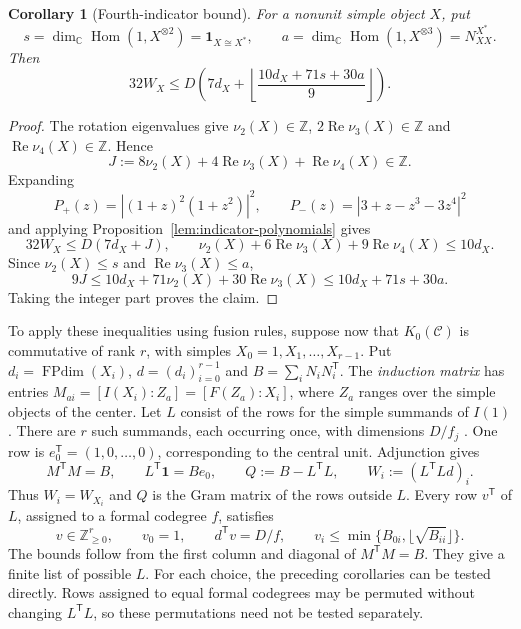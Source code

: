 \documentclass[11pt]{amsart}
\newtheorem{corollary}[theorem]{Corollary}
\theoremstyle{definition}
\DeclareMathOperator{\FPdim}{FPdim}
\newcommand{\C}{\mathbb C}
\newcommand{\Z}{\mathbb Z}
\numberwithin{equation}{section}
\begin{document}
\begin{corollary}[Fourth-indicator bound]\label{prop:fourth-indicator}
For a nonunit simple object $X$, put
\[
 s=\dim_{\C}\operatorname{Hom}(1,X^{\otimes2})=\mathbf1_{X\cong X^*},
 \qquad a=\dim_{\C}\operatorname{Hom}(1,X^{\otimes3})=N_{XX}^{X^*}.
\]
Then
\[
 32W_X\leq D\left(7d_X+
       \left\lfloor\frac{10d_X+71s+30a}{9}\right\rfloor\right).
\]
\end{corollary}
\begin{proof}
The rotation eigenvalues give $\nu_2(X)\in\Z$,
$2\operatorname{Re}\nu_3(X)\in\Z$ and
$\operatorname{Re}\nu_4(X)\in\Z$. Hence
\[
 J:=8\nu_2(X)+4\operatorname{Re}\nu_3(X)
                     +\operatorname{Re}\nu_4(X)\in\Z.
\]
Expanding
\[
 P_+(z)=|(1+z)^2(1+z^2)|^2,\qquad
 P_-(z)=|3+z-z^3-3z^4|^2
\]
and applying Proposition~\ref{lem:indicator-polynomials} gives
\[
 32W_X\leq D(7d_X+J),\qquad
 \nu_2(X)+6\operatorname{Re}\nu_3(X)+9\operatorname{Re}\nu_4(X)
 \leq10d_X.
\]
Since $\nu_2(X)\leq s$ and $\operatorname{Re}\nu_3(X)\leq a$,
\[
 9J\leq10d_X+71\nu_2(X)+30\operatorname{Re}\nu_3(X)
     \leq10d_X+71s+30a.
\]
Taking the integer part proves the claim.
\end{proof}

To apply these inequalities using fusion rules, suppose now that
$K_0(\mathcal C)$ is commutative of rank $r$, with simples
$X_0=1,X_1,\ldots,X_{r-1}$. Put $d_i=\FPdim(X_i)$,
$d=(d_i)_{i=0}^{r-1}$ and $B=\sum_iN_iN_i^{\mathsf T}$.
The \emph{induction matrix} has entries
$M_{ai}=[I(X_i):Z_a]=[F(Z_a):X_i]$, where $Z_a$ ranges over the
simple objects of the center. Let $L$ consist of the rows for the
simple summands of $I(1)$. There are $r$ such summands, each occurring
once, with dimensions $D/f_j$ \cite[Theorem~2.13]{OstrikRank3}.
One row is $e_0^{\mathsf T}=(1,0,\ldots,0)$, corresponding to the
central unit. Adjunction gives
\[
 M^{\mathsf T}M=B,\qquad L^{\mathsf T}\mathbf1=Be_0,\qquad
 Q:=B-L^{\mathsf T}L,\qquad W_i:=(L^{\mathsf T}Ld)_i.
\]
Thus $W_i=W_{X_i}$ and $Q$ is the Gram matrix of the rows outside $L$.
Every row $v^{\mathsf T}$ of $L$, assigned to a formal codegree $f$, satisfies
\[
 v\in\Z_{\geq0}^r,\qquad v_0=1,\qquad d^{\mathsf T}v=D/f,
 \qquad v_i\leq\min\{B_{0i},\lfloor\sqrt{B_{ii}}\rfloor\}.
\]
The bounds follow from the first column and diagonal of
$M^{\mathsf T}M=B$. They give a finite list of possible $L$.
For each choice, the preceding corollaries can be tested directly.
Rows assigned to equal formal codegrees may be permuted without changing
$L^{\mathsf T}L$, so these permutations need not be tested separately.
\end{document}
